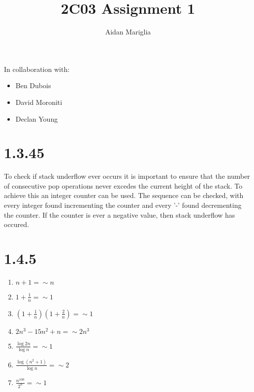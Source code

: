 \documentclass[12pt]{article}
\title{2C03 Assignment 1}
\author{Aidan Mariglia}
\begin{document}
\maketitle

In collaboration with:
\begin{itemize}[noitemsep]
  \item Ben Dubois
  \item David Moroniti
  \item Declan Young
\end{itemize}

\section*{1.3.45}
  
To check if stack underflow ever occurs it is important to ensure that
the number of consecutive pop operations never excedes the current height
of the stack. To achieve this an integer counter can be used. The sequence
can be checked, with every integer found incrementing the counter and every
'-' found decrementing the counter. If the counter is ever a negative value,
then stack underflow has occured.

\section*{1.4.5}

\begin{enumerate}[label=(\alph*)]

  \item $n + 1 = \sim  n$
  \item $1 + \frac{1}{n} = \sim 1$
  \item $(1 + \frac{1}{n})(1 + \frac{2}{n}) = \sim 1$
  \item $2n^3 - 15n^2 + n  = \sim 2n^3$
  \item $\frac{\log 2n}{\log n} = \sim 1$
  \item $\frac{\log (n^2 + 1)}{\log n} = \sim 2$
  \item $\frac{n^100}{2^n} = \sim 1$

\end{enumerate}
\end{document}
